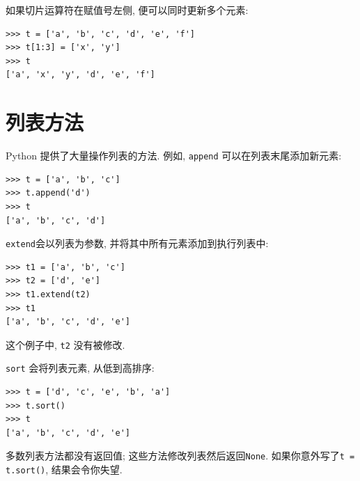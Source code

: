 \documentclass[10pt]{book}
\begin{document}
如果切片运算符在赋值号左侧, 便可以同时更新多个元素:

\begin{verbatim}
>>> t = ['a', 'b', 'c', 'd', 'e', 'f']
>>> t[1:3] = ['x', 'y']
>>> t
['a', 'x', 'y', 'd', 'e', 'f']
\end{verbatim}
%


%

%


\section{列表方法}

Python 提供了大量操作列表的方法. 例如, 
{\tt append} 可以在列表末尾添加新元素:

\begin{verbatim}
>>> t = ['a', 'b', 'c']
>>> t.append('d')
>>> t
['a', 'b', 'c', 'd']
\end{verbatim}
%
{\tt extend}会以列表为参数, 并将其中所有元素添加到执行列表中:

\begin{verbatim}
>>> t1 = ['a', 'b', 'c']
>>> t2 = ['d', 'e']
>>> t1.extend(t2)
>>> t1
['a', 'b', 'c', 'd', 'e']
\end{verbatim}
%
这个例子中, {\tt t2} 没有被修改. 

{\tt sort} 会将列表元素, 从低到高排序:

\begin{verbatim}
>>> t = ['d', 'c', 'e', 'b', 'a']
>>> t.sort()
>>> t
['a', 'b', 'c', 'd', 'e']
\end{verbatim}
%
多数列表方法都没有返回值; 这些方法修改列表然后返回{\tt None}. 
如果你意外写了{\tt t = t.sort()}, 结果会令你失望. 
\end{document}
